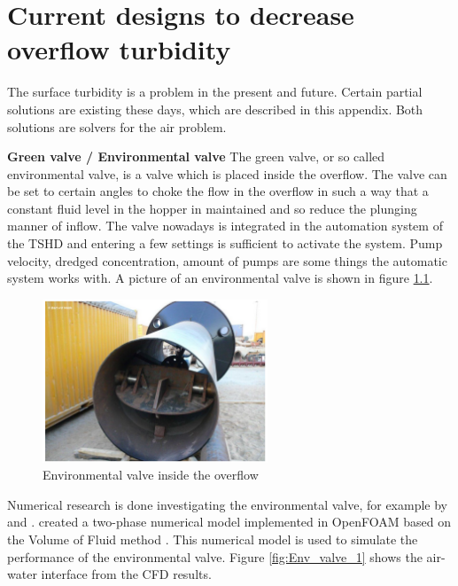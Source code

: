 \chapter{Current designs to decrease overflow turbidity}
\label{app:current_designs}

The surface turbidity is a problem in the present and future. Certain partial solutions are existing these days, which are described in this appendix. Both solutions are solvers for the air problem. \newline

\noindent \textbf{Green valve / Environmental valve} \newline
The green valve, or so called environmental valve, is a valve which is placed inside the overflow. The valve can be set to certain angles to choke the flow in the overflow in such a way that a constant fluid level in the hopper in maintained and so reduce the plunging manner of inflow. The valve nowadays is integrated in the automation system of the TSHD and entering a few settings is sufficient to activate the system. Pump velocity, dredged concentration, amount of pumps are some things the automatic system works with. A picture of an environmental valve is shown in figure \ref{fig:Env_valve}.

\begin{figure}[ht!]
    \centering
    \includegraphics[width =0.6\textwidth]{Images/Green_valve.png}
    \caption{Environmental valve inside the overflow}
    \label{fig:Env_valve}
\end{figure}

\noindent Numerical research is done investigating the environmental valve, for example by \citep{Saremi+} and \citep{Decrop}. \cite{Saremi+} created a two-phase numerical model implemented in OpenFOAM based on the Volume of Fluid method \citep{Hirt+}. This numerical model is used to simulate the performance of the environmental valve. Figure \ref{fig:Env_valve_1} shows the air-water interface from the CFD results.

